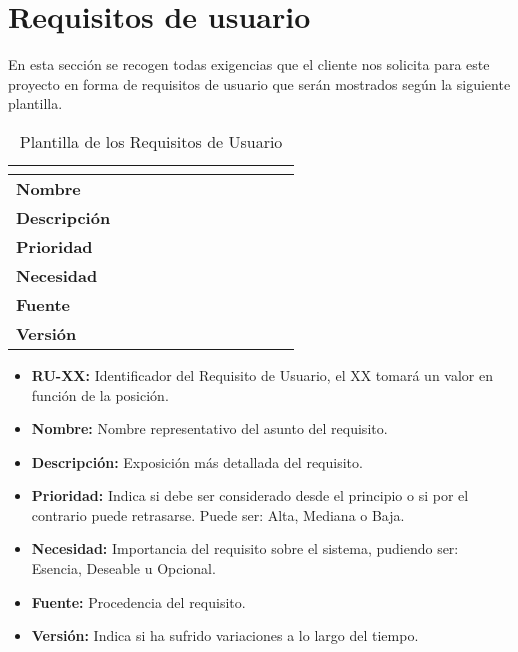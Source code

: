 \section{Requisitos de usuario}
En esta sección se recogen todas exigencias que el cliente nos solicita para este proyecto en forma de requisitos de usuario que serán mostrados según la siguiente plantilla.
\begin{table}[H]
	\centering
	\caption{Plantilla de los Requisitos de Usuario}
	\begin{tabular}{|l|l|}
		\hline
		\multicolumn{2}{|c|}{\cellcolor[HTML]{BFBFBF}{\color[HTML]{000000} \textbf{RU-XX}}} \\ \hline
		\textbf{Nombre}      &                                                      \\ \hline
		\textbf{Descripción} & $\quad\quad\quad\quad\quad\quad\quad\quad\quad\quad$ \\ \hline
		\textbf{Prioridad}   &                                                      \\ \hline
		\textbf{Necesidad}   &                                                      \\ \hline
		\textbf{Fuente}      &                                                      \\ \hline
		\textbf{Versión}     &                                                      \\ \hline
	\end{tabular}
\end{table}
\begin{itemize}
	\item \textbf{RU-XX:} Identificador del Requisito de Usuario, el XX tomará un valor en función de la posición.
	\item \textbf{Nombre:} Nombre representativo del asunto del requisito.
	\item \textbf{Descripción:} Exposición más detallada del requisito.
	\item \textbf{Prioridad:} Indica si debe ser considerado desde el principio o si por el contrario puede retrasarse. Puede ser: Alta, Mediana o Baja.
	\item \textbf{Necesidad:} Importancia del requisito sobre el sistema, pudiendo ser: Esencia, Deseable u Opcional.
	\item \textbf{Fuente:} Procedencia del requisito.
	\item \textbf{Versión:} Indica si ha sufrido variaciones a lo largo del tiempo.
\end{itemize}

